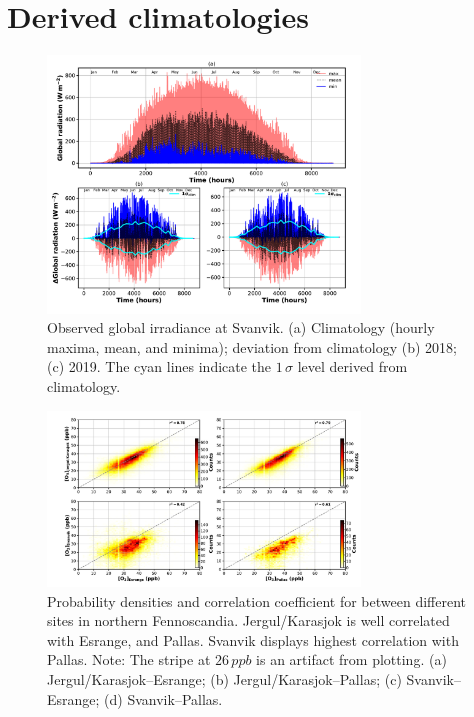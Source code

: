 \documentclass[bg, manuscript]{copernicus}
\begin{document}
\clearpage

\appendix
\section{Derived climatologies}    %


\appendixfigures  %
\begin{figure}[th]
  \includegraphics[width=8.3cm]{figA1}
  \caption{Observed global irradiance at Svanvik. (a) Climatology (hourly maxima, mean, and minima); deviation from climatology (b) 2018; (c) 2019. The cyan lines indicate the $1\,\sigma$ level derived from climatology.}
  \label{fig:global_rad_clim}
\end{figure}

\begin{figure}[th]
  \includegraphics[width=8.3cm]{figA2}
  \caption{Probability densities and correlation coefficient for \chem{[O_3]} between different sites in northern Fennoscandia. Jergul/Karasjok is well correlated with Esrange, and Pallas. Svanvik displays highest correlation with Pallas. Note: The stripe at $26\,\unit{ppb}$ is an artifact from plotting. (a) Jergul/Karasjok--Esrange; (b) Jergul/Karasjok--Pallas; (c) Svanvik--Esrange; (d) Svanvik--Pallas.}
  \label{fig:density_distribution}
\end{figure}
\end{document}
